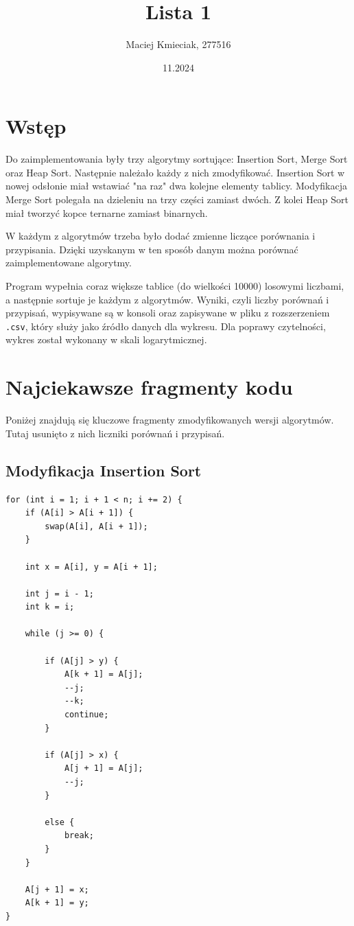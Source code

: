 \documentclass{article}
\title{Lista 1}
\author{Maciej Kmieciak, 277516}
\date{11.2024}
\begin{document}
\maketitle

\section{Wstęp}

Do zaimplementowania były trzy algorytmy sortujące: Insertion Sort, Merge Sort oraz Heap Sort. Następnie należało każdy z nich zmodyfikować. Insertion Sort w nowej odsłonie miał wstawiać "na raz" dwa kolejne elementy tablicy. Modyfikacja Merge Sort polegała na dzieleniu na trzy części zamiast dwóch. Z kolei Heap Sort miał tworzyć kopce ternarne zamiast binarnych.

W każdym z algorytmów trzeba było dodać zmienne liczące porównania i przypisania. Dzięki uzyskanym w ten sposób danym można porównać zaimplementowane algorytmy.

Program wypełnia coraz większe tablice (do wielkości 10000) losowymi liczbami, a następnie sortuje je każdym z algorytmów. Wyniki, czyli liczby porównań i przypisań, wypisywane są w konsoli oraz zapisywane w pliku z rozszerzeniem \texttt{.csv}, który służy jako źródło danych dla wykresu. Dla poprawy czytelności, wykres został wykonany w skali logarytmicznej.

\section{Najciekawsze fragmenty kodu}

Poniżej znajdują się kluczowe fragmenty zmodyfikowanych wersji algorytmów. Tutaj usunięto z nich liczniki porównań i przypisań.

\subsection{Modyfikacja Insertion Sort}

\begin{verbatim}
for (int i = 1; i + 1 < n; i += 2) {
    if (A[i] > A[i + 1]) {
        swap(A[i], A[i + 1]);
    }

    int x = A[i], y = A[i + 1];

    int j = i - 1;
    int k = i;

    while (j >= 0) {

        if (A[j] > y) {
            A[k + 1] = A[j];
            --j;
            --k;
            continue;
        }
        
        if (A[j] > x) {
            A[j + 1] = A[j];
            --j;
        }

        else {
            break;
        }
    }

    A[j + 1] = x;
    A[k + 1] = y;
}
\end{verbatim}
\end{document}
